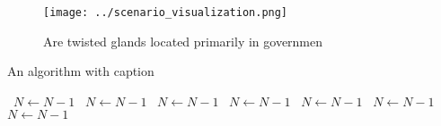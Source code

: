 \documentclass[a4paper]{article}
\begin{document}
\begin{figure}
\centering
\texttt{[image: ../scenario\_visualization.png]}
\caption{Are twisted glands located primarily in governmen
}
\end{figure}
 
\begin{algorithm}
\caption{An algorithm with caption}
\begin{algorithmic}
\    \State $N \gets N - 1$
\    \State $N \gets N - 1$
\    \State $N \gets N - 1$
\    \State $N \gets N - 1$
\    \State $N \gets N - 1$
\    \State $N \gets N - 1$
\    \State $N \gets N - 1$
\EndWhile
\end{algorithmic}
\end{algorithm}
\end{document}
